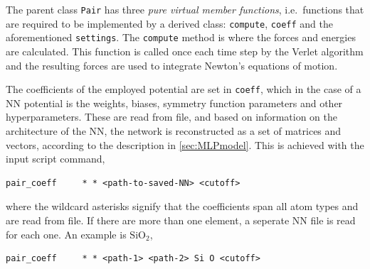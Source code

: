 \documentclass[twoside,english]{uiofysmaster}
\begin{document}
The parent class \texttt{Pair} has three \textit{pure virtual member functions}, i.e.\ functions that are required
to be implemented by a derived class: \texttt{compute}, \texttt{coeff} and the aforementioned \texttt{settings}. 
The \texttt{compute} method is where the forces and energies are calculated. This function is called
once each time step by the Verlet algorithm and the resulting forces are used to integrate Newton's equations
of motion. 

The coefficients of the employed potential are set in \texttt{coeff}, which in the case of a NN potential
is the weights, biases, symmetry function parameters and other hyperparameters. 
These are read from file, and based on information on the architecture of the NN, 
the network is reconstructed as a set of matrices and 
vectors, according to the description in \autoref{sec:MLPmodel}. This is achieved with the input script command,
\begin{lstlisting}[style=lammps]
 pair_coeff		* * <path-to-saved-NN> <cutoff> 
\end{lstlisting}
where the wildcard asterisks signify that the coefficients span all atom types and are read from file. 
If there are more than one element, a seperate NN file is read for each one. 
An example is $\mathrm{SiO}_2$,
\begin{lstlisting}[style=lammps]
 pair_coeff 	* * <path-1> <path-2> Si O <cutoff>
\end{lstlisting}
\end{document}
